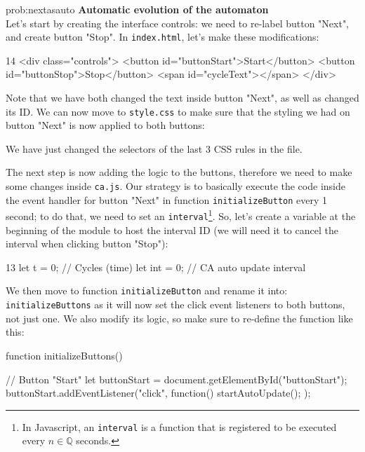 \begin{sol}{prob:nextasauto}
\textbf{Automatic evolution of the automaton}\\
Let's start by creating the interface controls: we need to re-label button "Next", and create button "Stop".
In \texttt{index.html}, let's make these modifications:
\begin{codehtmlh1}{1}{4}
<div class="controls">
  <button id="buttonStart">Start</button>
  <button id="buttonStop">Stop</button>
  <span id="cycleText"></span>
</div>
\end{codehtmlh1}
Note that we have both changed the text inside button "Next", as well as changed its ID.
We can now move to \texttt{style.css} to make sure that the styling we had on button "Next" is now
applied to both buttons:
We have just changed the selectors of the last 3 CSS rules in the file.

The next step is now adding the logic to the buttons, therefore we need to make some changes inside
\texttt{ca.js}. Our strategy is to basically execute the code inside the event handler for button "Next" in
function \texttt{initializeButton} every 1 second; to do that, we need to set an
\texttt{interval}\footnote{In Javascript, an \texttt{interval} is a function that is registered to be
executed every $n \in \mathbb{Q}$ seconds.}. So, let's create a variable at the beginning of the module to
host the interval ID (we will need it to cancel the interval when clicking button "Stop"):
\begin{codeh1}{1}{3}
let t = 0; // Cycles (time)
let int = 0; // CA auto update interval
\end{codeh1}
We then move to function \texttt{initializeButton} and rename it into: \texttt{initializeButtons} as it will now
set the click event listeners to both buttons, not just one. We also modify its logic, so make sure
to re-define the function like this:
\begin{code}
function initializeButtons() {
  // Button "Start"
  let buttonStart = document.getElementById("buttonStart");
  buttonStart.addEventListener("click", function(){
    startAutoUpdate();
  });

}
\end{code}
\end{sol}
